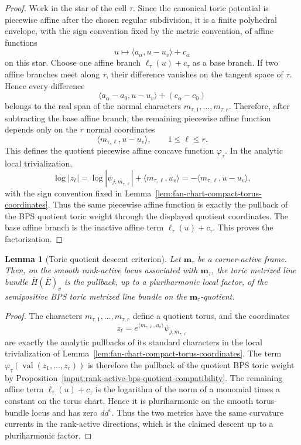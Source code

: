 \documentclass[10pt,a4paper]{amsart}
\theoremstyle{plain}
\newtheorem{lemma}[theorem]{Lemma}
\theoremstyle{plain}
\numberwithin{equation}{section}
\providecommand{\bE}{\overline{E}}
\begin{document}
\begin{proof}
	Work in the star of the cell \(\tau\).  Since the canonical toric potential is
	piecewise affine after the chosen regular subdivision, it is a finite
	polyhedral envelope, with the sign convention fixed by the metric convention,
	of affine functions
	\[
	u\longmapsto \langle a_\alpha,u-u_v\rangle+c_\alpha
	\]
	on this star.  Choose one affine branch \(\ell_\tau(u)+c_\tau\) as a base
	branch.  If two affine branches meet along \(\tau\), their difference vanishes
	on the tangent space of \(\tau\).  Hence every difference
	\[
	\langle a_\alpha-a_0,u-u_v\rangle+(c_\alpha-c_0)
	\]
	belongs to the real span of the normal characters
	\(m_{\tau,1},\ldots,m_{\tau,r}\).  Therefore, after subtracting the base affine
	branch, the remaining piecewise affine function depends only on the \(r\)
	normal coordinates
	\[
	\langle m_{\tau,\ell},u-u_v\rangle,\qquad 1\le \ell\le r .
	\]
	This defines the quotient piecewise affine concave function
	\(\varphi_\tau\).  In the analytic local trivialization,
	\[
	\log|z_\ell|
	=
	\log|\psi_{j,m_{\tau,\ell}}|
	+\langle m_{\tau,\ell},u_v\rangle
	=
	-\langle m_{\tau,\ell},u-u_v\rangle,
	\]
	with the sign convention fixed in
	Lemma~\ref{lem:fan-chart-compact-torus-coordinates}.  Thus the same
	piecewise affine function is exactly the pullback of the BPS quotient toric
	weight through the displayed quotient coordinates.  The base affine branch is
	the inactive affine term \(\ell_\tau(u)+c_\tau\).  This proves the
	factorization.
\end{proof}

\begin{lemma}[Toric quotient descent criterion]
	\label{lem:toric-quotient-descent-criterion}
	Let \(\mathbf m_\tau\) be a corner-active frame.  Then, on the smooth
	rank-active locus associated with \(\mathbf m_\tau\), the toric metrized line
	bundle \(\overline H(\bE)_v\) is the pullback, up to a pluriharmonic local
	factor, of the semipositive BPS toric metrized line bundle on the
	\(\mathbf m_\tau\)-quotient.
\end{lemma}

\begin{proof}
	The characters \(m_{\tau,1},\ldots,m_{\tau,r}\) define a quotient torus, and
	the coordinates
	\[
	z_\ell=e^{\langle m_{\tau,\ell},u_v\rangle}\psi_{j,m_{\tau,\ell}}
	\]
	are exactly the analytic pullbacks of its standard characters in the local
	trivialization of Lemma~\ref{lem:fan-chart-compact-torus-coordinates}.  The
	term
	\(\varphi_{\tau}(\operatorname{val}(z_1,\ldots,z_r))\) is therefore the
	pullback of the quotient BPS toric weight by
	Proposition~\ref{input:rank-active-bps-quotient-compatibility}.  The remaining
	affine term
	\(\ell_{\tau}(u)+c_{\tau}\) is the logarithm of the norm of a
	monomial times a constant on the torus chart.  Hence it is pluriharmonic on
	the smooth torus-bundle locus and has zero \(dd^c\).  Thus the two metrics
	have the same curvature currents in the rank-active directions, which is the
	claimed descent up to a pluriharmonic factor.
\end{proof}
\end{document}
